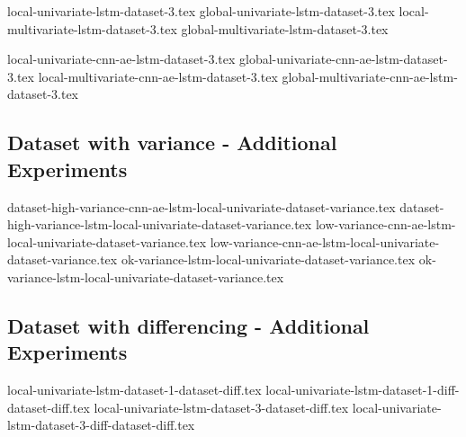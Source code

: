 {local-univariate-lstm-dataset-3.tex}
{global-univariate-lstm-dataset-3.tex}
{local-multivariate-lstm-dataset-3.tex}
{global-multivariate-lstm-dataset-3.tex}

{local-univariate-cnn-ae-lstm-dataset-3.tex}
{global-univariate-cnn-ae-lstm-dataset-3.tex}
{local-multivariate-cnn-ae-lstm-dataset-3.tex}
{global-multivariate-cnn-ae-lstm-dataset-3.tex}

\subsection{Dataset with variance - Additional Experiments}
{dataset-high-variance-cnn-ae-lstm-local-univariate-dataset-variance.tex}
{dataset-high-variance-lstm-local-univariate-dataset-variance.tex}
{low-variance-cnn-ae-lstm-local-univariate-dataset-variance.tex}
{low-variance-cnn-ae-lstm-local-univariate-dataset-variance.tex}
{ok-variance-lstm-local-univariate-dataset-variance.tex}
{ok-variance-lstm-local-univariate-dataset-variance.tex}

\subsection{Dataset with differencing - Additional Experiments}
{local-univariate-lstm-dataset-1-dataset-diff.tex}
{local-univariate-lstm-dataset-1-diff-dataset-diff.tex}
{local-univariate-lstm-dataset-3-dataset-diff.tex}
{local-univariate-lstm-dataset-3-diff-dataset-diff.tex}


